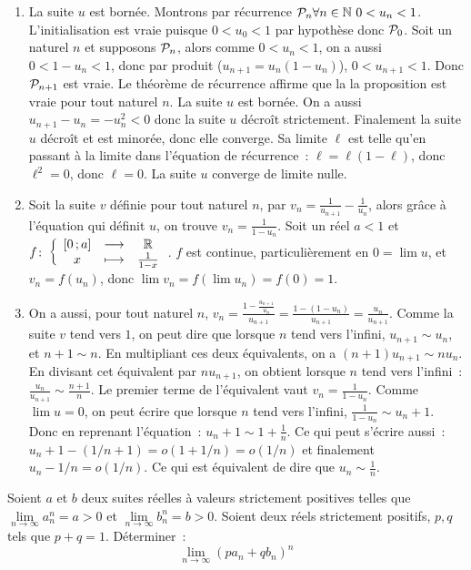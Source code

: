 \begin{enumerate}
    \item La suite \(u\) est bornée. Montrons par récurrence \(\P_n \forall n \in \N \ 0<u_n<1\). L'initialisation est vraie puisque \(0<u_0<1\) par hypothèse donc \(\P_0\). Soit un naturel \(n\) et supposons \(\P_n\), alors comme \(0<u_n<1\), on a aussi \(0<1-u_n<1\), donc par produit (\(u_{n+1} = u_n(1-u_n)\)), \(0<u_{n+1}<1\). Donc \(\P_{n+1}\) est vraie. Le théorème de récurrence affirme que la la proposition est vraie pour tout naturel \(n\). La suite \(u\) est bornée. On a aussi \(u_{n+1}-u_n = -u_n^2 < 0\) donc la suite \(u\) décroît strictement. Finalement la suite \(u\) décroît et est minorée, donc elle converge. Sa limite \(\ell\) est telle qu'en passant à la limite dans l'équation de récurrence~: \(\ell = \ell(1-\ell)\), donc \(\ell^2=0\), donc \(\ell = 0\). La suite \(u\) converge de limite nulle.
    \item Soit la suite \(v\) définie pour tout naturel \(n\), par \(v_n =\frac{1}{u_{n+1}} - \frac{1}{u_n}\), alors grâce à l'équation qui définit \(u\), on trouve \(v_n = \frac{1}{1-u_n}\). Soit un réel \(a<1\) et \(\fonction{f}{\intervalleff{0}{a}}{\R}{x}{\frac{1}{1-x}}\). \(f\) est continue, particulièrement en \(0=\lim u\), et \(v_n=f(u_n)\), donc \(\lim v_n = f(\lim u_n) = f(0) = 1\). 
    \item On a aussi, pour tout naturel \(n\),  \(v_n = \frac{1 - \frac{u_{n+1}}{u_n}}{u_{n+1}} = \frac{1-(1-u_n)}{u_{n+1}} = \frac{u_n}{u_{n+1}}\). Comme la suite \(v\) tend vers \(1\), on peut dire que lorsque \(n\) tend vers l'infini, \(u_{n+1} \sim u_n\), et \(n+1 \sim n\). En multipliant ces deux équivalents, on a \((n+1)u_{n+1} \sim n u_n\). En divisant cet équivalent par \(n u_{n+1}\), on obtient lorsque \(n\) tend vers l'infini~: \(\frac{u_n}{u_{n+1}} \sim \frac{n+1}{n}\). Le premier terme de l'équivalent vaut \(v_n = \frac{1}{1-u_n}\). Comme \(\lim u = 0\), on peut écrire que lorsque \(n\) tend vers l'infini, \(\frac{1}{1-u_n} \sim u_n+1\). Donc en reprenant l'équation~: \(u_n+1 \sim 1+\frac{1}{n}\). Ce qui peut s'écrire aussi~: \(u_n+1 -(1/n+1) = o(1+1/n) = o(1/n)\) et finalement \(u_n-1/n = o(1/n)\). Ce qui est équivalent de dire que \(u_n \sim \frac{1}{n}\).
\end{enumerate}
\begin{exercice}
    Soient \(a\) et \(b\) deux suites réelles à valeurs strictement positives telles que \(\lim\limits_{n\to\infty} a_n^n = a > 0\) et \(\lim\limits_{n\to\infty} b_n^n = b > 0\). Soient deux réels strictement positifs, \(p, q\) tels que \(p+q=1\). Déterminer~:
    \[\lim\limits_{n\to\infty} (pa_n+qb_n)^n\]
\end{exercice}
